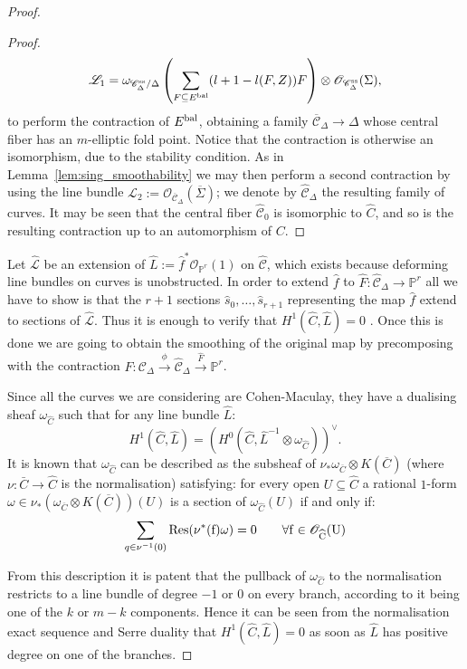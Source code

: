 \documentclass[11pt]{amsart}
\newcommand{\PP}{\mathbb P}
\newcommand{\OO}{\mathcal O}
\renewcommand{\to}{\rightarrow}
\newcommand{\hL}{\widehat{\mathcal L}}
\newcommand{\cC}{\mathcal C}
\newcommand{\hC}{\widehat{\mathcal C}}
\newcommand{\dvr}{\Delta}
\theoremstyle{plain}
\theoremstyle{definition}
\begin{document}
\begin{proof}
\begin{proof}
 \[\mathcal L_1=\omega_{\cC^{\rm{ss}}_{\dvr}/\dvr}\left( \sum_{F\subseteq E^{\rm{bal}}}(l+1-l(F,Z))F\right)\otimes \OO_{\cC^{\rm{ss}}_{\dvr}}(\Sigma),\]
 to perform the contraction of $E^{\rm{bal}}$, obtaining a family $\overline{\cC}_{\dvr}\to\dvr$ whose central fiber has an $m$-elliptic fold point. Notice that the contraction is otherwise an isomorphism, due to the stability condition.
 As in Lemma~\ref{lem:sing_smoothability} we may then perform a second contraction by using the line bundle $\mathcal L_2:=\OO_{\overline{\cC}_{\dvr}}(\overline{\Sigma})$; we denote by $\hC_{\dvr}$ the resulting family of curves. It may be seen that the central fiber $\hC_0$ is isomorphic to $\widehat C$, and so is the resulting contraction up to an automorphism of $C$. \end{proof}

Let $\hL$ be an extension of $\widehat{L}:=\hat{f}^*\OO_{\PP^r}(1)$ on $\hC$, which exists because deforming line bundles on curves is unobstructed.
In order to extend $\hat{f}$ to $\widehat{F}\colon \hC_{\dvr}\to\PP^r$ all we have to show is that the $r+1$ sections $\hat{s}_0,\dots, \hat{s}_{r+1}$ representing the map $\hat{f}$ extend to sections of $\hL.$
Thus it is enough to verify that $H^1(\widehat{C},\widehat{L})=0$ \cite{Wang}. Once this is done we are going to obtain the smoothing of the original map by precomposing with the contraction $F\colon\cC_{\dvr}\xrightarrow{\phi}\hC_{\dvr}\xrightarrow{\widehat F}\PP^r$.

Since all the curves we are considering are Cohen-Maculay, they have a dualising sheaf $\omega_{\widehat{C}}$ such that for any line bundle $\widehat{L}$:
\[H^1(\widehat{C},\widehat{L})=(H^0(\widehat{C},\widehat{L}^{-1}\otimes\omega_{\widehat{C}}))^{\vee}.\]
It is known \cite[IV, \S~3]{serre} that  $\omega_{\widehat{C}}$ can be described as the subsheaf of $\nu_* \omega_{\overline{C}}\otimes K(\overline{C})$ (where $\nu\colon\bar C\to\widehat{C}$ is the normalisation) satisfying: for every open $U\subseteq\widehat{C}$ a rational $1$-form $\omega\in \nu_*\left( \omega_{\overline{C}}\otimes K(\overline{C})\right)(U)$ is a section of $\omega_{\widehat{C}}(U)$ if and only if:
\[\sum_{q\in \nu^{-1}(0)}\rm{Res}(\nu^*(f)\omega) =0 \quad \quad \forall f\in\OO_{\widehat C}(U)\]

From this description it is patent that the pullback of $\omega_{\widehat{C}}$ to the normalisation restricts to a line bundle of degree $-1$ or $0$ on every branch, according to it being one of the $k$ or $m-k$ components. Hence it can be seen from the normalisation exact sequence and Serre duality that $H^1(\widehat{C},\widehat{L})=0$ as soon as $\hat L$ has positive degree on one of the branches.
 \end{proof}
\end{document}
